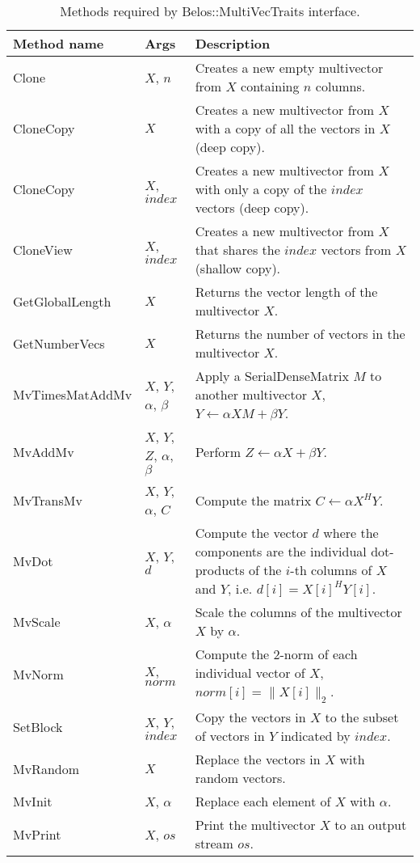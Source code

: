 \begin{table}
\begin{center}
\begin{tabular}{| p{3.5cm} |  p{2.2cm} || p{8cm} |}
\hline
Method name & Args & Description \\
\hline\hline
Clone           & $X$, $n$    
                & Creates a new empty multivector from $X$ containing $n$ columns.  \\\hline
CloneCopy       & $X$   
                & Creates a new multivector from $X$ with a copy of all the vectors in $X$ (deep copy). \\\hline
CloneCopy       & $X$, $index$   
                & Creates a new multivector from $X$ with only a copy of the $index$ vectors (deep copy). \\\hline
CloneView       & $X$, $index$ 
                & Creates a new multivector from $X$ that shares the $index$ vectors from $X$ (shallow copy).  \\\hline
GetGlobalLength & $X$ 
                & Returns the vector length of the multivector $X$.  \\\hline
GetNumberVecs   & $X$
                & Returns the number of vectors in the multivector $X$.  \\\hline
MvTimesMatAddMv & $X$, $Y$, $\alpha$, $\beta$
                & Apply a SerialDenseMatrix $M$ to another multivector $X$, $Y \leftarrow \alpha X M + \beta Y$.  \\\hline
MvAddMv         & $X$, $Y$, $Z$, $\alpha$, $\beta$
                & Perform $Z \leftarrow \alpha X + \beta Y$.  \\\hline
MvTransMv       & $X$, $Y$, $\alpha$, $C$
                & Compute the matrix $C \leftarrow \alpha X^H Y$.  \\\hline
MvDot           & $X$, $Y$, $d$
                & Compute the vector $d$ where the components are the individual dot-products of the $i$-th columns of $X$ and $Y$, i.e. $d[i] = X[i]^H Y[i]$.  \\\hline
MvScale         & $X$, $\alpha$
                & Scale the columns of the multivector $X$ by $\alpha$. \\\hline
MvNorm          & $X$, $norm$
                & Compute the 2-norm of each individual vector of $X$, $norm[i]=\|X[i]\|_2$. \\\hline
SetBlock        & $X$, $Y$, $index$
                & Copy the vectors in $X$ to the subset of vectors in $Y$ indicated by $index$. \\\hline
MvRandom        & $X$
                & Replace the vectors in $X$ with random vectors.  \\\hline
MvInit          & $X$, $\alpha$
                & Replace each element of $X$ with $\alpha$.  \\\hline
MvPrint         & $X$, $os$
                & Print the multivector $X$ to an output stream $os$.  \\\hline
\hline
\end{tabular}
\caption{Methods required by Belos::MultiVecTraits interface.}
\label{tab:belos:mvt}
\end{center}
\end{table}

